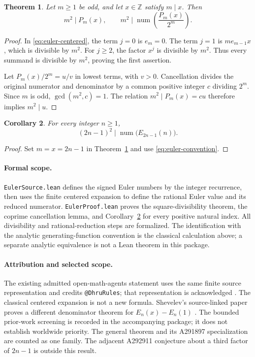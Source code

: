 \documentclass[11pt]{article}
\newtheorem{theorem}{Theorem}[section]
\newtheorem{corollary}[theorem]{Corollary}
\newcommand{\Z}{\mathbb{Z}}
\begin{document}
\begin{theorem}\label{thm:euler-general}
Let $m\ge1$ be odd, and let $x\in\Z$ satisfy $m\mid x$. Then
\[
 m^2\mid P_m(x),\qquad
 m^2\mid\operatorname{num}\!\left(\frac{P_m(x)}{2^m}\right).
\]
\end{theorem}

\begin{proof}
In \eqref{eq:euler-centered}, the term $j=0$ is $e_m=0$.
The term $j=1$ is $m e_{m-1}x$, which is divisible by $m^2$.
For $j\ge2$, the factor $x^j$ is divisible by $m^2$.
Thus every summand is divisible by $m^2$, proving the first assertion.

Let $P_m(x)/2^m=u/v$ in lowest terms, with $v>0$. Cancellation
divides the original numerator and denominator by a common positive
integer $c$ dividing $2^m$. Since $m$ is odd, $\gcd(m^2,c)=1$.
The relation $m^2\mid P_m(x)=cu$ therefore implies $m^2\mid u$.
\end{proof}

\begin{corollary}\label{thm:euler-source}
For every integer $n\ge1$,
\[
 (2n-1)^2\mid\operatorname{num}\bigl(E_{2n-1}(n)\bigr).
\]
\end{corollary}

\begin{proof}
Set $m=x=2n-1$ in Theorem~\ref{thm:euler-general} and use
\eqref{eq:euler-convention}.
\end{proof}

\paragraph{Formal scope.}
\texttt{EulerSource.lean} defines the signed Euler numbers by the integer
recurrence, then uses the finite centered expansion to define the rational
Euler value and its reduced numerator. \texttt{EulerProof.lean} proves
the square-divisibility theorem, the coprime cancellation lemma, and
Corollary~\ref{thm:euler-source} for every positive natural index.
All divisibility and rational-reduction steps are formalized. The identification
with the analytic generating-function convention is the classical calculation
above; a separate analytic equivalence is not a Lean theorem in this package.

\paragraph{Attribution and selected scope.}
The existing admitted open-math-agents statement uses the same finite
source representation and credits \texttt{@DhruRules}; that representation
is acknowledged \cite{a291897-oma}. The classical centered expansion is
not a new formula. Shevelev's source-linked paper proves a different
denominator theorem for $E_n(x)-E_n(1)$ \cite{a291897-shevelev}.
The bounded prior-work screening is recorded in the accompanying package;
it does not establish worldwide priority. The general theorem and its
A291897 specialization are counted as one family. The adjacent
A292911 conjecture about a third factor of $2n-1$ is outside this result.
\end{document}
